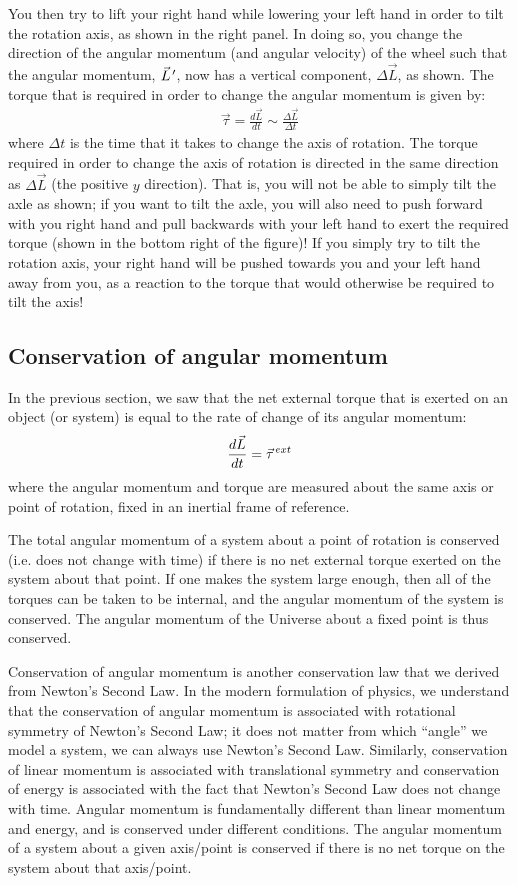 You then try to lift your right hand while lowering your left hand in order to tilt the rotation axis, as shown in the right panel. In doing so, you change the direction of the angular momentum (and angular velocity) of the wheel such that the angular momentum, $\pvec L'$, now has a vertical component, $\Delta \vec L$, as shown. The torque that is required in order to change the angular momentum is given by:
\begin{align*}
\vec \tau = \frac{d\vec L}{dt} \sim \frac{\Delta \vec L}{\Delta t}
\end{align*}
where $\Delta t$ is the time that it takes to change the axis of rotation. The torque required in order to change the axis of rotation is directed in the same direction as $\Delta \vec L$ (the positive $y$ direction). That is, you will not be able to simply tilt the axle as shown; if you want to tilt the axle, you will also need to push forward with you right hand and pull backwards with your left hand to exert the required torque (shown in the bottom right of the figure)! If you simply try to tilt the rotation axis, your right hand will be pushed towards you and your left hand away from you, as a reaction to the torque that would otherwise be required to tilt the axis!

\subsection{Conservation of angular momentum}
In the previous section, we saw that the net external torque that is exerted on an object (or system) is equal to the rate of change of its angular momentum:
\begin{align*}
\frac{d\vec L}{dt} = \pvec \tau^{ext}
\end{align*}
where the angular momentum and torque are measured about the same axis or point of rotation, fixed in an inertial frame of reference.

The total angular momentum of a system about a point of rotation is conserved (i.e. does not change with time) if there is no net external torque exerted on the system about that point. If one makes the system large enough, then all of the torques can be taken to be internal, and the angular momentum of the system is conserved. The angular momentum of the Universe about a fixed point is thus conserved.

Conservation of angular momentum is another conservation law that we derived from Newton's Second Law. In the modern formulation of physics, we understand that the conservation of angular momentum is associated with rotational symmetry of Newton's Second Law; it does not matter from which ``angle'' we model a system, we can always use Newton's Second Law. Similarly, conservation of linear momentum is associated with translational symmetry and conservation of energy is associated with the fact that Newton's Second Law does not change with time. Angular momentum is fundamentally different than linear momentum and energy, and is conserved under different conditions. The angular momentum of a system about a given axis/point is conserved if there is no net torque on the system about that axis/point.



